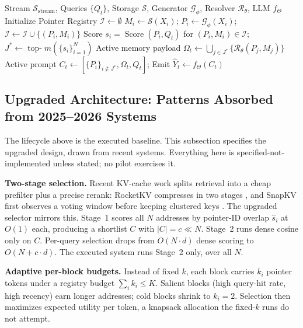 \documentclass[runningheads]{llncs}
\begin{document}
\begin{algorithm}[t]
\caption{Lifecycle of SemPointer Addressing and Resolution.}\label{alg:sempointer}
\begin{algorithmic}[1]
\footnotesize
\REQUIRE Stream $\mathcal{S}_{\text{stream}}$, Queries $\{Q_t\}$, Storage $\mathcal{S}$, Generator $\mathcal{G}_{\phi}$, Resolver $\mathcal{R}_{\theta}$, LLM $f_{\Theta}$
\STATE Initialize Pointer Registry $\mathcal{I} \leftarrow \emptyset$
    \STATE $M_i \leftarrow \mathcal{S}(X_i)$; \quad $P_i \leftarrow \mathcal{G}_{\phi}(X_i)$; \quad $\mathcal{I} \leftarrow \mathcal{I} \cup \{(P_i, M_i)\}$
\ENDFOR
{}
    \STATE Score $s_i = \operatorname{Score}(P_i, Q_t)$ for $(P_i, M_i) \in \mathcal{I}$; \quad $J^* \leftarrow \operatorname{top-}m(\{s_i\}_{i=1}^N)$
    \STATE Active memory payload $\Omega_t \leftarrow \bigcup_{j \in J^*} \{\mathcal{R}_{\theta}(P_j, M_j)\}$
    \STATE Active prompt $C_t \leftarrow [\{P_i\}_{i \notin J^*}, \Omega_t, Q_t]$; \quad Emit $\hat{Y}_t \leftarrow f_{\Theta}(C_t)$
\ENDFOR
\end{algorithmic}
\end{algorithm}

\subsection{Upgraded Architecture: Patterns Absorbed from 2025--2026 Systems}
The lifecycle above is the executed baseline. This subsection specifies the upgraded design, drawn from recent systems. Everything here is specified-not-implemented unless stated; no pilot exercises it.

\noindent\textbf{Two-stage selection.} Recent KV-cache work splits retrieval into a cheap prefilter plus a precise rerank: RocketKV compresses in two stages \cite{behnam2025rocketkv}, and SnapKV first observes a voting window before keeping clustered keys \cite{li2024snapkv}. The upgraded selector mirrors this. Stage~1 scores all $N$ addresses by pointer-ID overlap $\hat{s}_i$ at $O(1)$ each, producing a shortlist $C$ with $|C| = c \ll N$. Stage~2 runs dense cosine only on $C$. Per-query selection drops from $O(N{\cdot}d)$ dense scoring to $O(N + c{\cdot}d)$. The executed system runs Stage~2 only, over all $N$.

\noindent\textbf{Adaptive per-block budgets.} Instead of fixed $k$, each block carries $k_i$ pointer tokens under a registry budget $\sum_i k_i \le K$. Salient blocks (high query-hit rate, high recency) earn longer addresses; cold blocks shrink to $k_i = 2$. Selection then maximizes expected utility per token, a knapsack allocation the fixed-$k$ runs do not attempt.
\end{document}
